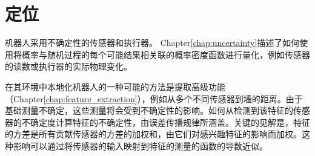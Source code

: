 \chapter{定位}
\label{chap:localization}


机器人采用不确定性的传感器和执行器。 Chapter\ref{chap:uncertainty}描述了如何使用将概率与随机过程的每个可能结果相关联的概率密度函数进行量化，例如传感器的读数或执行器的实际物理变化。





在其环境中本地化机器人的一种可能的方法是提取高级功能（Chapter\ref{chap:feature_extraction}），例如从多个不同传感器到墙的距离。由于基础测量不确定，这些测量将会受到不确定性的影响。如何从检测到该特征的传感器的不确定度计算特征的不确定性，由误差传播规律所涵盖。关键的见解是，特征的方差是所有贡献传感器的方差的加权和，由它们对感兴趣特征的影响而加权。这种影响可以通过将传感器的输入映射到特征的测量的函数的导数近似。

